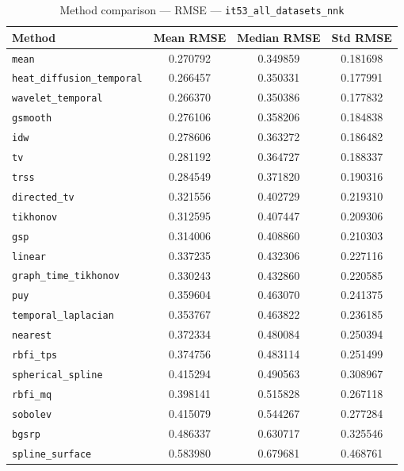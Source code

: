 \begin{table}[ht]
\centering
\caption{Method comparison — RMSE — \texttt{it53_all_datasets_nnk}}
\label{tab:rmse_it53_all_datasets_nnk}
\begin{tabular}{lccc}
\hline
Method & Mean RMSE & Median RMSE & Std RMSE \\
\hline
\texttt{mean} & 0.270792 & 0.349859 & 0.181698 \\
\texttt{heat_diffusion_temporal} & 0.266457 & 0.350331 & 0.177991 \\
\texttt{wavelet_temporal} & 0.266370 & 0.350386 & 0.177832 \\
\texttt{gsmooth} & 0.276106 & 0.358206 & 0.184838 \\
\texttt{idw} & 0.278606 & 0.363272 & 0.186482 \\
\texttt{tv} & 0.281192 & 0.364727 & 0.188337 \\
\texttt{trss} & 0.284549 & 0.371820 & 0.190316 \\
\texttt{directed_tv} & 0.321556 & 0.402729 & 0.219310 \\
\texttt{tikhonov} & 0.312595 & 0.407447 & 0.209306 \\
\texttt{gsp} & 0.314006 & 0.408860 & 0.210303 \\
\texttt{linear} & 0.337235 & 0.432306 & 0.227116 \\
\texttt{graph_time_tikhonov} & 0.330243 & 0.432860 & 0.220585 \\
\texttt{puy} & 0.359604 & 0.463070 & 0.241375 \\
\texttt{temporal_laplacian} & 0.353767 & 0.463822 & 0.236185 \\
\texttt{nearest} & 0.372334 & 0.480084 & 0.250394 \\
\texttt{rbfi_tps} & 0.374756 & 0.483114 & 0.251499 \\
\texttt{spherical_spline} & 0.415294 & 0.490563 & 0.308967 \\
\texttt{rbfi_mq} & 0.398141 & 0.515828 & 0.267118 \\
\texttt{sobolev} & 0.415079 & 0.544267 & 0.277284 \\
\texttt{bgsrp} & 0.486337 & 0.630717 & 0.325546 \\
\texttt{spline_surface} & 0.583980 & 0.679681 & 0.468761 \\
\hline
\end{tabular}
\end{table}

